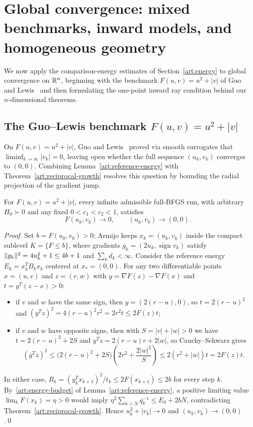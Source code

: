 \section{Global convergence: mixed benchmarks, inward models, and homogeneous geometry}\label{art:global}

We now apply the comparison-energy estimates of Section~\ref{art:energy} to
global convergence on $\mathbb R^n$, beginning with the benchmark $F(u,v)=u^2+|v|$ of
Guo and Lewis~\cite{GL18} and then formulating the one-point inward ray
condition behind our $n$-dimensional theorems.

\subsection{The Guo--Lewis benchmark $F(u,v)=u^2+|v|$}

On $F(u,v)=u^2+|v|$, Guo and Lewis~\cite[Corollary~4.4]{GL18} proved via smooth
surrogates that $\liminf_{k\to\infty}|v_k|=0$, leaving open whether the full
sequence $(u_k,v_k)$ converges to $(0,0)$. Combining
Lemma~\ref{art:reference-energy} with Theorem~\ref{art:reciprocal-growth}
resolves this question by bounding the radial projection of the gradient jump.

\begin{corollary}\label{art:mixed-benchmark}
For $F(u,v)=u^2+|v|$, every infinite admissible full-BFGS run, with arbitrary
$H_0\succ0$ and any fixed $0<c_1<c_2<1$, satisfies
\[
 F(u_k,v_k)\longrightarrow0,\qquad (u_k,v_k)\longrightarrow(0,0).
\]
\end{corollary}
\begin{proof}
Set $b=F(u_0,v_0)>0$; Armijo keeps $x_k=(u_k,v_k)$ inside the compact sublevel
$K=\{F\le b\}$, where gradients $g_k=(2u_k,\operatorname{sign}v_k)$ satisfy
$\lVert g_k\rVert^2=4u_k^2+1\le4b+1$ and $\sum_kd_k<\infty$. Consider the reference
energy $E_k=x_k^TB_kx_k$ centered at $x_*=(0,0)$. For any two differentiable
points $x=(u,v)$ and $z=(r,w)$ with $y=\nabla F(z)-\nabla F(x)$ and
$t=y^T(z-x)>0$:
\begin{itemize}
\item if $v$ and $w$ have the same sign, then $y=(2(r-u),0)$, so
$t=2(r-u)^2$ and $(y^Tz)^2=4(r-u)^2r^2=2r^2t\le2F(z)t$;
\item if $v$ and $w$ have opposite signs, then with $S=|v|+|w|>0$ we have
$t=2(r-u)^2+2S$ and $y^Tz=2(r-u)r+2|w|$, so Cauchy--Schwarz gives
\[
 (y^Tz)^2\le\bigl(2(r-u)^2+2S\bigr)\left(2r^2+\frac{2|w|^2}{S}\right)
 \le2(r^2+|w|)t=2F(z)t.
\]
\end{itemize}
In either case, $R_k=(y_k^Tx_{k+1})^2/t_k\le2F(x_{k+1})\le2b$ for every step
$k$. By~\eqref{art:energy-budget} of Lemma~\ref{art:reference-energy}, a
positive limiting value $\lim_kF(x_k)=\eta>0$ would imply
$\eta^2\sum_{k<N}q_k^{-1}\le E_0+2bN$, contradicting
Theorem~\ref{art:reciprocal-growth}. Hence $u_k^2+|v_k|\to0$ and
$(u_k,v_k)\to(0,0)$.\qed
\end{proof}

